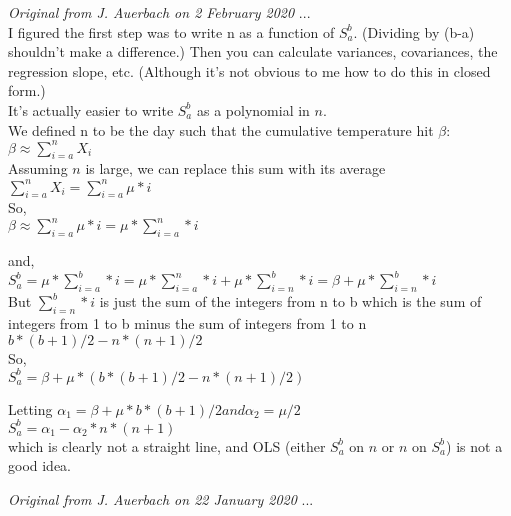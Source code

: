 \documentclass[11pt,letter]{article}
\begin{document}
\emph{Original from J. Auerbach on 2 February 2020} ...\\
I figured the first step was to write n as a function of $S_a^b$. (Dividing by (b-a) shouldn't make a difference.) Then you can calculate variances, covariances, the regression slope, etc. (Although it's not obvious to me how to do this in closed form.)\\

It's actually easier to write $S_a^b$ as a polynomial in $n$.\\

We defined n to be the day such that the cumulative temperature hit $\beta$:\\

$\beta \approx \sum_{i=a}^n X_i$\\

Assuming $n$ is large, we can replace this sum with its average\\

$\sum_{i=a}^n X_i = \sum_{i=a}^n \mu * i$\\

So,\\

$\beta \approx \sum_{i=a}^n \mu * i =  \mu * \sum_{i=a}^n * i$

and,\\

$S_a^b = \mu * \sum_{i=a}^b * i  = \mu * \sum_{i=a}^n * i  + \mu * \sum_{i=n}^b * i  = \beta + \mu * \sum_{i=n}^b * i $\\

But $\sum_{i=n}^b * i$ is just the sum of the integers from n to b which is the sum of integers from 1 to b minus the sum of integers from 1 to n\\

$b * (b + 1) / 2 - n * (n + 1) / 2 $\\

So,\\

$S_a^b  = \beta + \mu * (b * (b + 1) / 2 - n * (n + 1) / 2)$

Letting $\alpha_1 = \beta + \mu * b * (b + 1) / 2 and \alpha_2 = \mu/2$\\

$S_a^b = \alpha_1 -  \alpha_2 * n * (n + 1)$\\

which is clearly not a straight line, and OLS (either $S_a^b$  on $n$ or $n$ on $S_a^b$) is not a good idea.

\emph{Original from J. Auerbach on 22 January 2020} ...\\
\end{document}
